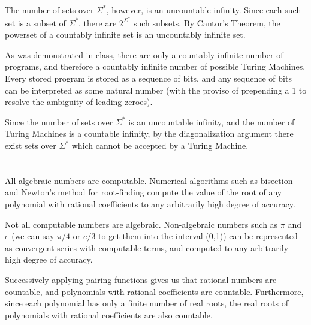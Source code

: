 \documentclass{article}
\begin{document}
\vspace{1em}

The number of sets over $\Sigma^*$, however, is an uncountable infinity. Since
each such set is a subset of
$\Sigma^*$, there are $2^{\Sigma^*}$ such subsets. By Cantor's Theorem, the
powerset of a countably infinite set is an uncountably infinite set.

\vspace{1em}

As was demonstrated in class, there are only a countably infinite number of 
programs, and therefore a countably infinite number of possible Turing Machines.
Every stored program is stored as a sequence of bits, and any sequence of bits
can be interpreted as some natural number (with the proviso of prepending a 1
to resolve the ambiguity of leading zeroes).

\vspace{1em}

Since the number of sets over $\Sigma^*$ is an uncountable infinity, and the
number of Turing Machines is a countable infinity, by the diagonalization
argument there exist sets over $\Sigma^*$ which cannot be accepted by a Turing
Machine.

\section{}
All algebraic numbers are computable. Numerical algorithms such as bisection and
Newton's method for root-finding compute the value of the root of any
polynomial with rational coefficients to any arbitrarily high degree of
accuracy.

\vspace{1em}

Not all computable numbers are algebraic. Non-algebraic numbers such as $\pi$
and $e$ (we can say $\pi/4$ or $e/3$ to get them into the interval (0,1)) can be
represented as convergent series with computable terms, and computed
to any arbitrarily high degree of accuracy.

\vspace{1em}

Successively applying pairing functions gives us that rational numbers are
countable, and polynomials with rational coefficients are countable.
Furthermore, since each polynomial has only a finite number of real roots, the
real roots of polynomials with rational coefficients are also countable.

\vspace{1em}
\end{document}
